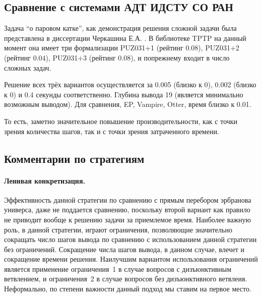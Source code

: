 


\subsection{Сравнение с системами АДТ ИДСТУ СО РАН}
Задача ``о паровом катке'', как демонстрация решения сложной задачи была представлена в диссертации Черкашина Е.А. \cite{dissChe}.
В библиотеке TPTP на данный момент она имеет три формализации PUZ031+1 (рейтинг 0.08), PUZ031+2 (рейтинг 0.04), PUZ031+3 (рейтинг 0.08), и попрежнему входит в число сложных задач.

Решение всех трёх вариантов осуществляется за 0.005 (близко к 0), 0.002 (близко к 0) и 0.4 секунды соответственно. Глубина вывода 19 (является минимально возможным выводом). Для сравнения, EP, Vampire, Otter, время близко к 0.01.

То есть, заметно значительное повышение производительности, как с точки зрения количества шагов, так и с точки зрения затраченного времени.



\subsection{Комментарии по стратегиям}

\paragraph{Ленивая конкретизация.}
Эффективность данной стратегии по сравнению с прямым перебором эрбранова универса, даже не поддается сравнению, поскольку второй вариант как правило не приводит вообще к решению задачи за приемлемое время. Наиболее важную роль, в данной стратегии, играют ограничения, позволяющие значительно сокращать число шагов вывода по сравнению с использованием данной стратегии без ограничений. Сокращение числа шагов вывода, в данном случае, влечет и сокращение времени решения. Наилучшим вариантом использования ограничений является применение ограничения~1 в случае вопросов с дизъюнктивным ветвлением, и ограничения~2 в случае вопросов без дизъюнктивного ветвлеия. Неформально, по степени важности данный подход мы ставим на первое место.

